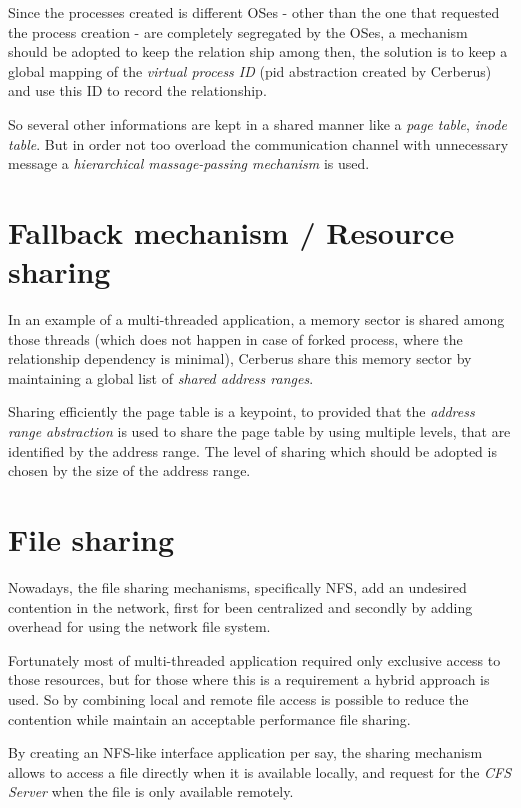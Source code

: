 \documentclass[journal]{IEEEtran}
\begin{document}
\begin{itemize}
	Since the processes created is different OSes - other than the one that requested the process creation - are completely segregated by the OSes, a mechanism should be adopted to keep the relation ship among then, the solution is to keep a global mapping of the \emph{virtual process ID} (pid abstraction created by Cerberus) and use this ID to record the relationship.
	
	So several other informations are kept in a shared manner like a \emph{page table}, \emph{inode table}. But in order not too overload the communication channel with unnecessary message a \emph{hierarchical massage-passing mechanism} is used.
	
	\section{Fallback mechanism / Resource sharing}
	
	In an example of a multi-threaded application, a memory sector is shared among those threads (which does not happen in case of forked process, where the relationship dependency is minimal), Cerberus share this memory sector by maintaining a global list of \emph{shared address ranges}.
	
	
	Sharing efficiently the page table is a keypoint, to provided that the \emph{address range abstraction} is used to share the page table by using multiple levels, that are identified by the address range. The level of sharing which should be adopted is chosen by the size of the address range.
	
	
	\section{File sharing}
	
	Nowadays, the file sharing mechanisms, specifically NFS, add an undesired contention in the network, first for been centralized and secondly by adding overhead for using the network file system. %
	
	Fortunately most of multi-threaded application required only exclusive access to those resources, but for those where this is a requirement a hybrid approach is used. So by combining local and remote file access is possible to reduce the contention while maintain an acceptable performance file sharing. %
	
	By creating an NFS-like interface application per say, the sharing mechanism allows to access a file directly when it is available locally, and request for the \emph{CFS Server} when the file is only available remotely.


\end{itemize}
\end{document}
